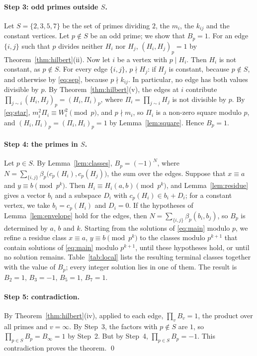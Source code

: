 \documentclass[11pt]{article}
\begin{document}
\paragraph{Step 3: odd primes outside $S$.} Let $S=\{2,3,5,7\}$ be the set of primes dividing $2$, the $m_{i}$, the $k_{ij}$ and the constant vertices. Let $p\notin S$ be an odd prime; we show that $B_p=1$. For an edge $\{i,j\}$ such that $p$ divides neither $H_i$ nor $H_j$, $(H_i,H_j)_p=1$ by Theorem~\ref{thm:hilbert}(ii). Now let $i$ be a vertex with $p\mid H_i$. Then $H_i$ is not constant, as $p\notin S$. For every edge $\{i,j\}$, $p\nmid H_j$: if $H_j$ is constant, because $p\notin S$, and otherwise by \eqref{eq:sep}, because $p\nmid k_{ij}$. In particular, no edge has both values divisible by $p$. By Theorem~\ref{thm:hilbert}(v), the edges at $i$ contribute $\prod_{j\sim i}(H_i,H_j)_p=(H_i,\Pi_i)_p$, where $\Pi_i=\prod_{j\sim i}H_j$ is not divisible by $p$. By \eqref{eq:star}, $m_i^2\Pi_i\equiv W_i^2\pmod p$, and $p\nmid m_i$, so $\Pi_i$ is a non-zero square modulo $p$, and $(H_i,\Pi_i)_p=(\Pi_i,H_i)_p=1$ by Lemma~\ref{lem:square}. Hence $B_p=1$.

\paragraph{Step 4: the primes in $S$.} Let $p\in S$. By Lemma~\ref{lem:classes}, $B_p=(-1)^{N}$, where $N=\sum_{\{i,j\}}\beta_p\bigl(c_p(H_i),c_p(H_j)\bigr)$, the sum over the edges. Suppose that $x\equiv a$ and $y\equiv b\pmod{p^k}$. Then $H_i\equiv H_i(a,b)\pmod{p^k}$, and Lemma~\ref{lem:residue} gives a vector $b_i$ and a subspace $D_i$ with $c_p(H_i)\in b_i+D_i$; for a constant vertex, we take $b_i=c_p(H_i)$ and $D_i=0$. If the hypotheses of Lemma~\ref{lem:envelope} hold for the edges, then $N=\sum_{\{i,j\}}\beta_p(b_i,b_j)$, so $B_p$ is determined by $a$, $b$ and $k$. Starting from the solutions of \eqref{eq:main} modulo $p$, we refine a residue class $x\equiv a$, $y\equiv b\pmod{p^k}$ to the classes modulo $p^{k+1}$ that contain solutions of \eqref{eq:main} modulo $p^{k+1}$, until these hypotheses hold, or until no solution remains. Table~\ref{tab:local} lists the resulting terminal classes together with the value of $B_p$; every integer solution lies in one of them. The result is $B_{2}=1$, $B_{3}=-1$, $B_{5}=1$, $B_{7}=1$.

\paragraph{Step 5: contradiction.} By Theorem~\ref{thm:hilbert}(iv), applied to each edge, $\prod_vB_v=1$, the product over all primes and $v=\infty$. By Step~3, the factors with $p\notin S$ are $1$, so $\prod_{p\in S}B_p=B_\infty=1$ by Step~2. But by Step~4, $\prod_{p\in S}B_p=-1$. This contradiction proves the theorem.
\qed
\end{document}
